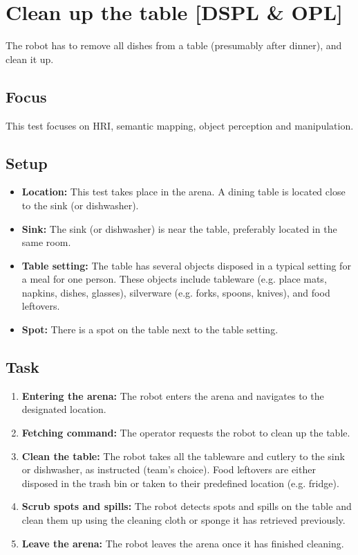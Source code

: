\section{Clean up the table [DSPL \& OPL]}
The robot has to remove all dishes from a table (presumably after dinner), and clean it up.

\subsection{Focus}
This test focuses on HRI, semantic mapping, object perception and manipulation.

\subsection{Setup}
\begin{itemize}
	\item \textbf{Location:} This test takes place in the arena. A dining table is located close to the sink (or dishwasher).
	\item \textbf{Sink:} The sink (or dishwasher) is near the table, preferably located in the same room.
	\item \textbf{Table setting:} The table has several objects disposed in a typical setting for a meal for one person. These objects include tableware (e.g. place mats, napkins, dishes, glasses), silverware (e.g. forks, spoons, knives), and food leftovers.
	\item \textbf{Spot:} There is a spot on the table next to the table setting.
\end{itemize}

\subsection{Task}
	\begin{enumerate}
		\item \textbf{Entering the arena:} The robot enters the arena and navigates to the designated location.
		\item \textbf{Fetching command:} The operator requests the robot to clean up the table.
		\item \textbf{Clean the table:} The robot takes all the tableware and cutlery to the sink or dishwasher, as instructed (team's choice). Food leftovers are either disposed in the trash bin or taken to their predefined location (e.g. fridge).
		\item \textbf{Scrub spots and spills:} The robot detects spots and spills on the table and clean them up using the cleaning cloth or sponge it has retrieved previously.
		\item \textbf{Leave the arena:} The robot leaves the arena once it has finished cleaning.
	\end{enumerate}

